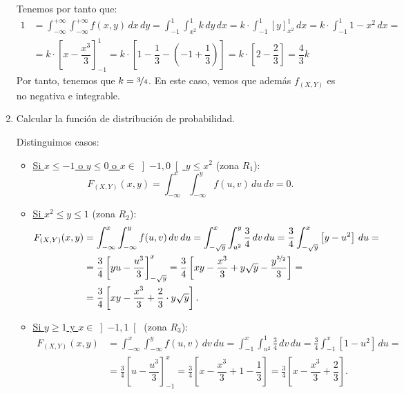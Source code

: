 \begin{ejercicio}
\begin{enumerate}
        Tenemos por tanto que:
        \begin{align*}
            1&=\int_{-\infty}^{+\infty} \int_{-\infty}^{+\infty} f(x, y) \, dx \, dy
            = \int_{-1}^{1} \int_{x^2}^{1} k \, dy \, dx = k\cdot \int_{-1}^{1} \left[y\right]_{x^2}^{1} \, dx = k\cdot \int_{-1}^{1} 1-x^2 \, dx =\\&= k\cdot \left[x-\dfrac{x^3}{3}\right]_{-1}^{1} = k\cdot \left[1-\dfrac{1}{3}-\left(-1+\dfrac{1}{3}\right)\right] = k\cdot \left[2-\dfrac{2}{3}\right] = \dfrac{4}{3}k
        \end{align*}
        Por tanto, tenemos que $k=\nicefrac{3}{4}$. En este caso, vemos que además $f_{(X,Y)}$ es no negativa e integrable.

        \item Calcular la función de distribución de probabilidad.
        
        Distinguimos casos:
        \begin{itemize}
            \item \ul{Si $x\leq -1$ \quad o \quad $y\leq 0$ \quad o \quad $x\in \left]-1,0\right[$  $y\leq x^2$} (zona $R_1$):
            \begin{equation*}
                F_{(X,Y)}(x, y) = \int_{-\infty}^x \int_{-\infty}^y f(u, v) \, du \, dv = 0.
            \end{equation*}

            \item \ul{Si $x^2\leq y\leq 1$} (zona $R_2$):
            \begin{align*}
                F_{(X,Y)}(x, y) &= \int_{-\infty}^x \int_{-\infty}^y f(u, v) \, dv \, du = \int_{-\sqrt{y}}^x \int_{u^2}^y \frac{3}{4} \, dv \, du = \frac{3}{4}\int_{-\sqrt{y}}^x \left[y-u^2\right] \, du =\\&= \frac{3}{4}\left[yu-\dfrac{u^3}{3}\right]_{-\sqrt{y}}^x = \frac{3}{4}\left[xy-\dfrac{x^3}{3}+y\sqrt{y}-\dfrac{y^{\nicefrac{3}{2}}}{3}\right] =\\
                &= \frac{3}{4}\left[xy-\dfrac{x^3}{3}+\dfrac{2}{3}\cdot y\sqrt{y}\right].
            \end{align*}

            \item \ul{Si $y\geq 1$ y $x\in \left]-1,1\right[$} (zona $R_3$):
            \begin{align*}
                F_{(X,Y)}(x, y) &= \int_{-\infty}^x \int_{-\infty}^y f(u, v) \, dv \, du = \int_{-1}^x \int_{u^2}^1 \frac{3}{4} \, dv \, du = \frac{3}{4}\int_{-1}^x \left[1-u^2\right] \, du =\\&= \frac{3}{4}\left[u-\dfrac{u^3}{3}\right]_{-1}^x = \frac{3}{4}\left[x-\dfrac{x^3}{3}+1-\dfrac{1}{3}\right] = \frac{3}{4}\left[x-\dfrac{x^3}{3}+\dfrac{2}{3}\right].
            \end{align*}


\end{itemize}
\end{enumerate}
\end{ejercicio}
